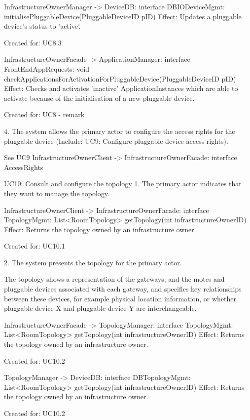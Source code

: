 {{{            InfrastructureOwnerManager -> DeviceDB: interface DBIODeviceMgmt: initialisePluggableDevice(PluggableDeviceID pID)
                Effect: Updates a pluggable device's status to 'active'.
                \item Created for: UC8.3

            InfrastructureOwnerFacade -> ApplicationManager: interface FrontEndAppRequests: void checkApplicationsForActivationForPluggableDevice(PluggableDeviceID pID)
                Effect: Checks and activates 'inactive' ApplicationInstances which are able to activate because of the initialisation of a new pluggable device.
                \item Created for: UC8 - remark

        4. The system allows the primary actor to configure the access rights for the pluggable device (Include: UC9: Configure pluggable device access rights).

            See UC9
            InfrastructureOwnerClient -> InfrastructureOwnerFacade: interface AccessRights


    UC10: Consult and configure the topology
        1. The primary actor indicates that they want to manage the topology.

            InfrastructureOwnerClient -> InfrastructureOwnerFacade: interface TopologyMgmt: List<RoomTopology> getTopology(int infrastructureOwnerID)
                Effect: Returns the topology owned by an infrastructure owner.
                \item Created for: UC10.1

        2. The system presents the topology for the primary actor.
           { The topology shows a representation of the gateways, and the motes and pluggable devices associated with each gateway,
           and specifies key relationships between these devices, for example physical location information,
           or whether pluggable device X and pluggable device Y are interchangeable.

            InfrastructureOwnerFacade -> TopologyManager: interface TopologyMgmt: List<RoomTopology> getTopology(int infrastructureOwnerID)
               Effect: Returns the topology owned by an infrastructure owner.
               \item Created for: UC10.2

            TopologyManager -> DeviceDB: interface DBTopologyMgmt: List<RoomTopology> getTopology(int infrastructureOwnerID)
               Effect: Returns the topology owned by an infrastructure owner.
               \item Created for: UC10.2

}}}}
